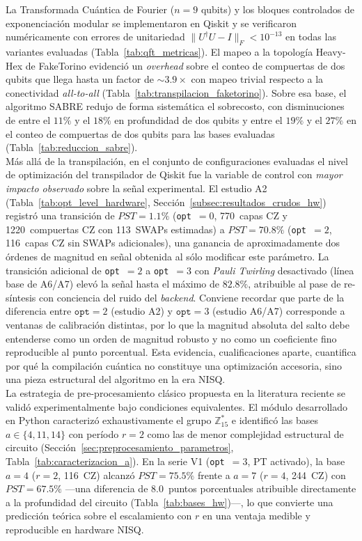 \documentclass[12pt, spanish]{book}
\begin{document}
La Transformada Cuántica de Fourier ($n = 9$ qubits) y los bloques controlados de exponenciación modular se implementaron en Qiskit y se verificaron numéricamente con errores de unitariedad $\lVert U^{\dagger} U - I \rVert_F < 10^{-13}$ en todas las variantes evaluadas (Tabla~\ref{tab:qft_metricas}). El mapeo a la topología Heavy-Hex de FakeTorino evidenció un \textit{overhead} sobre el conteo de compuertas de dos qubits que llega hasta un factor de $\sim 3.9\times$ con mapeo trivial respecto a la conectividad \textit{all-to-all} (Tabla~\ref{tab:transpilacion_faketorino}). Sobre esa base, el algoritmo SABRE redujo de forma sistemática el sobrecosto, con disminuciones de entre el $11\%$ y el $18\%$ en profundidad de dos qubits y entre el $19\%$ y el $27\%$ en el conteo de compuertas de dos qubits para las bases evaluadas (Tabla~\ref{tab:reduccion_sabre}).\\

Más allá de la transpilación, en el conjunto de configuraciones evaluadas el nivel de optimización del transpilador de Qiskit fue la variable de control con \emph{mayor impacto observado} sobre la señal experimental. El estudio A2 (Tabla~\ref{tab:opt_level_hardware}, Sección~\ref{subsec:resultados_crudos_hw}) registró una transición de $PST = 1.1\%$ (\texttt{opt}~$=0$, 770~capas CZ y 1220~compuertas CZ con 113~SWAPs estimadas) a $PST = 70.8\%$ (\texttt{opt}~$=2$, 116~capas CZ sin SWAPs adicionales), una ganancia de aproximadamente dos órdenes de magnitud en señal obtenida al sólo modificar este parámetro. La transición adicional de \texttt{opt}~$=2$ a \texttt{opt}~$=3$ con \textit{Pauli Twirling} desactivado (línea base de A6/A7) elevó la señal hasta el máximo de $82.8\%$, atribuible al pase de re-síntesis con conciencia del ruido del \textit{backend}. Conviene recordar que parte de la diferencia entre $\texttt{opt}=2$ (estudio A2) y $\texttt{opt}=3$ (estudio A6/A7) corresponde a ventanas de calibración distintas, por lo que la magnitud absoluta del salto debe entenderse como un orden de magnitud robusto y no como un coeficiente fino reproducible al punto porcentual. Esta evidencia, cualificaciones aparte, cuantifica por qué la compilación cuántica no constituye una optimización accesoria, sino una pieza estructural del algoritmo en la era NISQ.\\

La estrategia de pre-procesamiento clásico propuesta en la literatura reciente \cite{villarreal} se validó experimentalmente bajo condiciones equivalentes. El módulo desarrollado en Python caracterizó exhaustivamente el grupo $\mathbb{Z}_{15}^*$ e identificó las bases $a \in \{4, 11, 14\}$ con período $r = 2$ como las de menor complejidad estructural de circuito (Sección~\ref{sec:preprocesamiento_parametros}, Tabla~\ref{tab:caracterizacion_a}). En la serie V1 (\texttt{opt}~$=3$, PT activado), la base $a = 4$ ($r = 2$, 116~CZ) alcanzó $PST = 75.5\%$ frente a $a = 7$ ($r = 4$, 244~CZ) con $PST = 67.5\%$ ---una diferencia de 8.0~puntos porcentuales atribuible directamente a la profundidad del circuito (Tabla~\ref{tab:bases_hw})---, lo que convierte una predicción teórica sobre el escalamiento con $r$ en una ventaja medible y reproducible en hardware NISQ.\\
\end{document}
